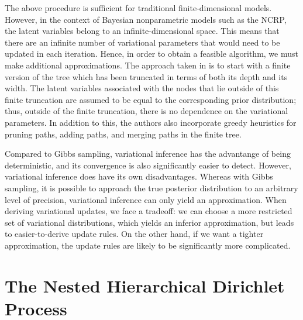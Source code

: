 \documentclass{article}
\begin{document}
The above procedure is sufficient for traditional finite-dimensional models.
However, in the context of Bayesian nonparametric models such as the NCRP, the latent variables belong to an infinite-dimensional space.
This means that there are an infinite number of variational parameters that would need to be updated in each iteration.
Hence, in order to obtain a feasible algorithm, we must make additional approximations.
The approach taken in \cite{wang2009vi_ncrp} is to start with a finite version of the tree which has been truncated in terms of both its depth and its width.
The latent variables associated with the nodes that lie outside of this finite truncation are assumed to be equal to the corresponding prior distribution; thus, outside of the finite truncation, there is no dependence on the variational parameters.
In addition to this, the authors also incorporate greedy heuristics for pruning paths, adding paths, and merging paths in the finite tree.


Compared to Gibbs sampling, variational inference has the advantange of being deterministic, and its convergence is also significantly easier to detect.
However, variational inference does have its own disadvantages.
Whereas with Gibbs sampling, it is possible to approach the true posterior distribution to an arbitrary level of precision, variational inference can only yield an approximation.
When deriving variational updates, we face a tradeoff: we can choose a more restricted set of variational distributions, which yields an inferior approximation, but leads to easier-to-derive update rules.
On the other hand, if we want a tighter approximation, the update rules are likely to be significantly more complicated.

\section{The Nested Hierarchical Dirichlet Process}
\end{document}
